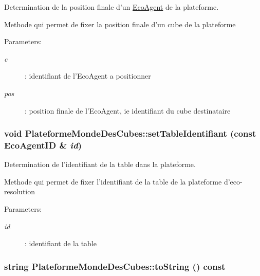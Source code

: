 Determination de la position finale d'un \hyperlink{classEcoAgent}{EcoAgent} de la plateforme. 

Methode qui permet de fixer la position finale d'un cube de la plateforme

\begin{Desc}
\item[Parameters:]
\begin{description}
\item[{\em c}]: identifiant de l'EcoAgent a positionner \item[{\em pos}]: position finale de l'EcoAgent, ie identifiant du cube destinataire \end{description}
\end{Desc}
\hypertarget{classPlateformeMondeDesCubes_cf6eccc70251d89c4d12c921f44934af}{
\subsubsection[{setTableIdentifiant}]{\setlength{\rightskip}{0pt plus 5cm}void PlateformeMondeDesCubes::setTableIdentifiant (const {\bf EcoAgentID} \& {\em id})}}
\label{classPlateformeMondeDesCubes_cf6eccc70251d89c4d12c921f44934af}


Determination de l'identifiant de la table dans la plateforme. 

Methode qui permet de fixer l'identifiant de la table de la plateforme d'eco-resolution

\begin{Desc}
\item[Parameters:]
\begin{description}
\item[{\em id}]: identifiant de la table \end{description}
\end{Desc}
\hypertarget{classPlateformeMondeDesCubes_a834747e527529fd8c4bfc61bee6c20f}{
\subsubsection[{toString}]{\setlength{\rightskip}{0pt plus 5cm}string PlateformeMondeDesCubes::toString () const}}
\label{classPlateformeMondeDesCubes_a834747e527529fd8c4bfc61bee6c20f}


